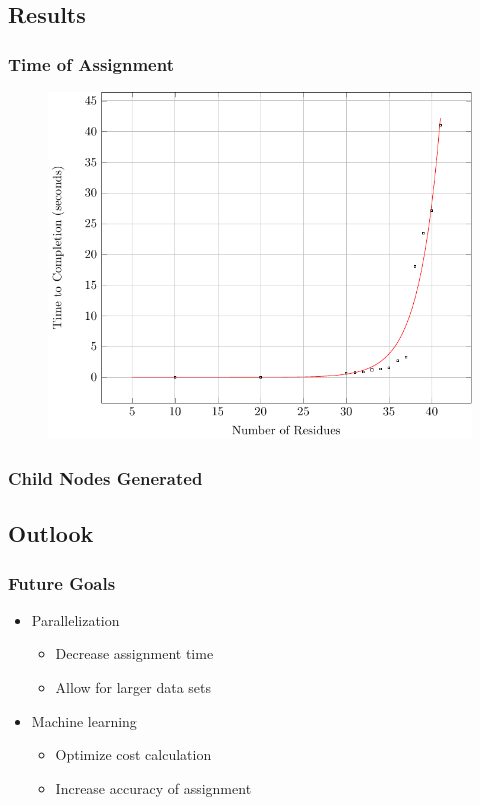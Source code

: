 \documentclass{beamer}
\begin{document}
\subsection{Results}

\begin{frame}
	\frametitle{Time of Assignment}
	\begin{figure}[H]
	\begin{center}
	\includegraphics[width=.65\textwidth]{plot}
	\end{center}
	\end{figure}
\end{frame}

\begin{frame}
	\frametitle{Child Nodes Generated}
	\begin{figure}[H]
	\begin{center}
	\resizebox{!}{.6\paperheight}{}
	\end{center}
	\end{figure}
\end{frame}

\subsection{Outlook}
\begin{frame}
	\frametitle{Future Goals} 
	\begin{itemize}
		\item Parallelization
		\begin{itemize}
			\item Decrease assignment time
			\item Allow for larger data sets
		\end{itemize}
		\item Machine learning 
		\begin{itemize}
			\item Optimize cost calculation
			\item Increase accuracy of assignment
		\end{itemize}
	\end{itemize} 
\end{frame}
\end{document}
